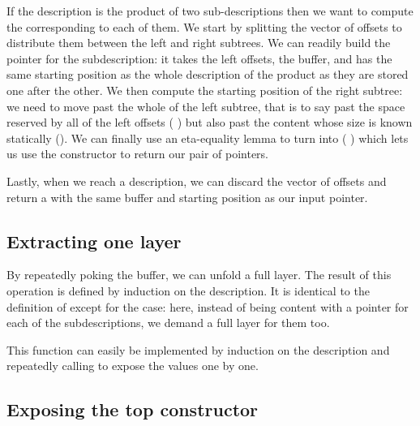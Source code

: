 If the description is the product of two sub-descriptions then we
want to compute the  corresponding to
each of them.
%
We start by splitting the vector of offsets to distribute them between
the left and right subtrees.
%
We can readily build the pointer for the  subdescription:
it takes the left offsets, the buffer, and has the same starting position
as the whole description of the product as they are stored one after the other.
%
We then compute the starting position of the right subtree: we need to
move past the whole of the left subtree, that is to say past the space
reserved by all of the left offsets ( )
but also past the content whose size is known statically ().
%
We can finally use an eta-equality lemma to turn  into
(  \IdrisData{\#}  )
which lets us use the  constructor \IdrisData{(\#)} to return our
pair of pointers.


Lastly, when we reach a  description, we can discard the
vector of offsets and return a  with the same buffer
and starting position as our input pointer.

\subsection{Extracting one layer}

By repeatedly poking the buffer, we can unfold a full layer.
The result of this operation is defined by induction
on the description. It is identical to the definition of
 except for the  case:
here, instead of being content with a pointer for each of the
subdescriptions, we demand a full layer for them too.


This function can easily be implemented by induction on the description
and repeatedly calling  to expose the values one by
one.


\subsection{Exposing the top constructor}


